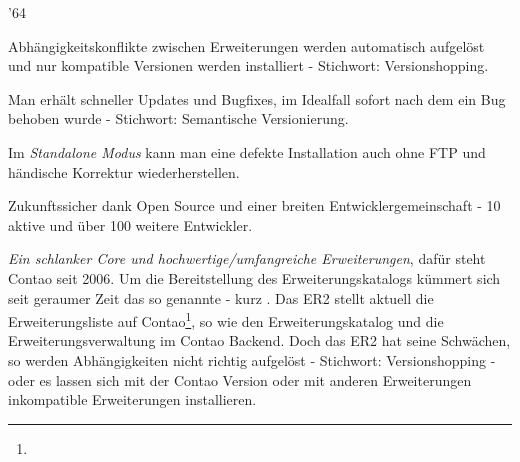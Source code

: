 \documentclass[
paper=a4,
draft=false,%
fontsize=10pt%
]{scrartcl}
\begin{document}
\begin{minipage}{.02\linewidth}
\end{minipage}
\begin{minipage}{.98\linewidth}
  \begin{dinglist}{'64}
  \item Abhängigkeitskonflikte zwischen Erweiterungen werden automatisch aufgelöst und nur kompatible Versionen werden installiert - Stichwort: Versionshopping\footnotemark.
  \item Man erhält schneller Updates und Bugfixes, im Idealfall sofort nach dem ein Bug behoben wurde - Stichwort: Semantische Versionierung\footnotemark.
  \item Im \textit{Standalone Modus} kann man eine defekte Installation auch ohne FTP und händische Korrektur wiederherstellen.
  \item Zukunftssicher dank Open Source und einer breiten Entwicklergemeinschaft - 10 aktive und über 100 weitere Entwickler.
  \end{dinglist}
\end{minipage}

\addtocounter{footnote}{-1}

\textit{Ein schlanker Core und hochwertige/umfangreiche Erweiterungen}, dafür steht Contao seit 2006. Um die Bereitstellung des Erweiterungskatalogs kümmert sich seit geraumer Zeit das so genannte  - kurz . Das ER2 stellt aktuell die Erweiterungsliste auf Contao\footnote{}, so wie den Erweiterungskatalog und die Erweiterungsverwaltung im Contao Backend. Doch das ER2 hat seine Schwächen, so werden Abhängigkeiten nicht richtig aufgelöst - Stichwort: Versionshopping - oder es lassen sich mit der Contao Version oder mit anderen Erweiterungen inkompatible Erweiterungen installieren.
\end{document}
